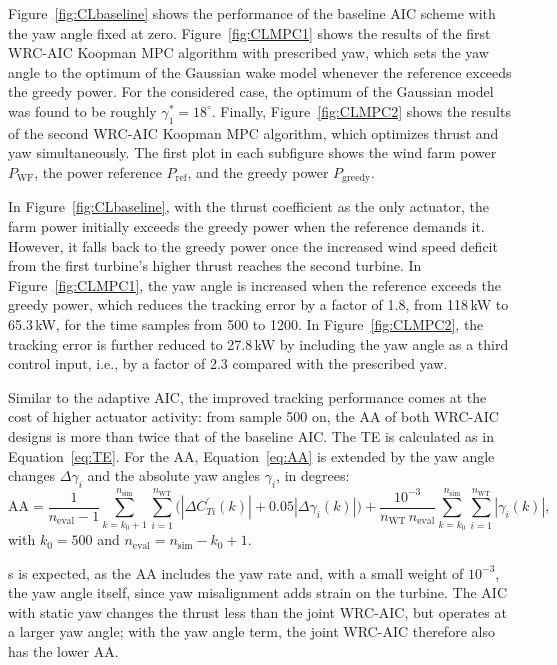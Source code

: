 Figure~\ref{fig:CLbaseline} shows the performance of the baseline AIC scheme with the yaw angle fixed at zero. Figure~\ref{fig:CLMPC1} shows the results of the first WRC-AIC Koopman MPC algorithm with prescribed yaw, which sets the yaw angle to the optimum of the Gaussian wake model whenever the reference exceeds the greedy power. For the considered case, the optimum of the Gaussian model was found to be roughly $\gamma_1^* = 18^\circ$. Finally, Figure~\ref{fig:CLMPC2} shows the results of the second WRC-AIC Koopman MPC algorithm, which optimizes thrust and yaw simultaneously. The first plot in each subfigure shows the wind farm power $P_{\text{WF}}$, the power reference $P_{\text{ref}}$, and the greedy power $P_{\text{greedy}}$.

In Figure~\ref{fig:CLbaseline}, with the thrust coefficient as the only actuator, the farm power initially exceeds the greedy power when the reference demands it. However, it falls back to the greedy power once the increased wind speed deficit from the first turbine's higher thrust reaches the second turbine. In Figure~\ref{fig:CLMPC1}, the yaw angle is increased when the reference exceeds the greedy power, which reduces the tracking error by a factor of 1.8, from 118\,kW to 65.3\,kW, for the time samples from 500 to 1200. 
In Figure~\ref{fig:CLMPC2}, the tracking error is further reduced to 27.8\,kW by including the yaw angle as a third control input, i.e., by a factor of 2.3 compared with the prescribed yaw.

Similar to the adaptive AIC, the improved tracking performance comes at the cost of higher actuator activity: from sample 500 on, the AA of both WRC-AIC designs is more than twice that of the baseline AIC. 
The TE is calculated as in Equation~\eqref{eq:TE}. For the AA, Equation~\eqref{eq:AA} is extended by the yaw angle changes $\Delta\gamma_i$ and the absolute yaw angles $\gamma_i$, in degrees:
\begin{equation}
    \text{AA} = \frac{1}{n_\text{eval}-1}\sum_{k=k_0+1}^{n_\text{sim}} \sum_{i=1}^{n_{\text{WT}}} \Big( \left|\Delta C_{Ti}^\prime(k)\right| + 0.05 \left|\Delta \gamma_i(k)\right| \Big) + \frac{10^{-3}}{n_{\text{WT}}\, n_\text{eval}}\sum_{k=k_0}^{n_\text{sim}}\sum_{i=1}^{n_{\text{WT}}} \left|\gamma_i(k)\right|,
\end{equation}
with $k_0 = 500$ and $n_\text{eval} = n_\text{sim} - k_0 + 1$.

s is expected, as the AA includes the yaw rate and, with a small weight of $10^{-3}$, the yaw angle itself, since yaw misalignment adds strain on the turbine. The AIC with static yaw changes the thrust less than the joint WRC-AIC, but operates at a larger yaw angle; with the yaw angle term, the joint WRC-AIC therefore also has the lower AA.

